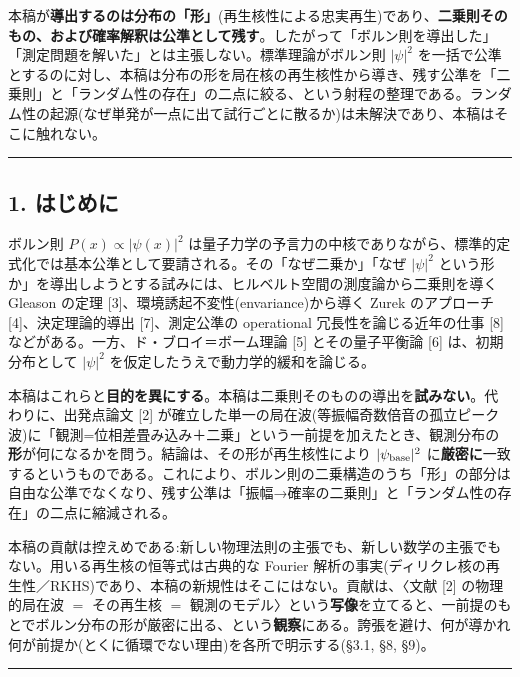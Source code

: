 \documentclass[
]{ltjsarticle}
\begin{document}
本稿が\textbf{導出するのは分布の「形」}(再生核性による忠実再生)であり、\textbf{二乗則そのもの、および確率解釈は公準として残す}。したがって「ボルン則を導出した」「測定問題を解いた」とは主張しない。標準理論がボルン則
\(|\psi|^2\)
を一括で公準とするのに対し、本稿は分布の形を局在核の再生核性から導き、残す公準を「二乗則」と「ランダム性の存在」の二点に絞る、という射程の整理である。ランダム性の起源(なぜ単発が一点に出て試行ごとに散るか)は未解決であり、本稿はそこに触れない。

\begin{center}\rule{0.5\linewidth}{0.5pt}\end{center}

\subsection{1. はじめに}\label{ux306fux3058ux3081ux306b}

ボルン則 \(P(x)\propto|\psi(x)|^2\)
は量子力学の予言力の中核でありながら、標準的定式化では基本公準として要請される。その「なぜ二乗か」「なぜ
\(|\psi|^2\)
という形か」を導出しようとする試みには、ヒルベルト空間の測度論から二乗則を導く
Gleason の定理 {[}3{]}、環境誘起不変性(envariance)から導く Zurek
のアプローチ {[}4{]}、決定理論的導出 {[}7{]}、測定公準の operational
冗長性を論じる近年の仕事 {[}8{]}
などがある。一方、ド・ブロイ＝ボーム理論 {[}5{]} とその量子平衡論
{[}6{]} は、初期分布として \(|\psi|^2\)
を仮定したうえで動力学的緩和を論じる。

本稿はこれらと\textbf{目的を異にする}。本稿は二乗則そのものの導出を\textbf{試みない}。代わりに、出発点論文
{[}2{]}
が確立した単一の局在波(等振幅奇数倍音の孤立ピーク波)に「観測=位相差畳み込み＋二乗」という一前提を加えたとき、観測分布の\textbf{形}が何になるかを問う。結論は、その形が再生核性により
\(|\psi_{\rm base}|^2\)
に\textbf{厳密に}一致するというものである。これにより、ボルン則の二乗構造のうち「形」の部分は自由な公準でなくなり、残す公準は「振幅→確率の二乗則」と「ランダム性の存在」の二点に縮減される。

本稿の貢献は控えめである:新しい物理法則の主張でも、新しい数学の主張でもない。用いる再生核の恒等式は古典的な
Fourier
解析の事実(ディリクレ核の再生性／RKHS)であり、本稿の新規性はそこにはない。貢献は、〈文献
{[}2{]} の物理的局在波 \(=\) その再生核 \(=\)
観測のモデル〉という\textbf{写像}を立てると、一前提のもとでボルン分布の形が厳密に出る、という\textbf{観察}にある。誇張を避け、何が導かれ何が前提か(とくに循環でない理由)を各所で明示する(§3.1,
§8, §9)。

\begin{center}\rule{0.5\linewidth}{0.5pt}\end{center}
\end{document}
